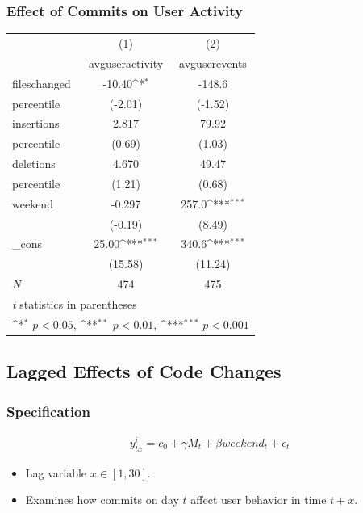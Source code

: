 \documentclass[xcolor=pdftex,dvipsnames,table]{beamer}
\begin{document}
\frame
{
    \frametitle{Effect of Commits on User Activity}
    \begin{table}[h!]
    \footnotesize
    \centering
    {
        \def\sym#1{\ifmmode^{#1}\else\(^{#1}\)\fi}
        \begin{tabular}{l*{2}{c}}
        \hline\hline
            &\multicolumn{1}{c}{(1)}&\multicolumn{1}{c}{(2)}\\
            &\multicolumn{1}{c}{avguseractivity}&\multicolumn{1}{c}{avguserevents}\\
            \hline
            fileschanged&     -10.40\sym{*}         &    -148.6  \\
 percentile           &     (-2.01)         &     (-1.52)   \\
            [1em]
            insertions&      2.817  &     79.92 \\
percentile
    &      (0.69)         &      (1.03)         \\
        [1em]
        deletions&      4.670        &    49.47    \\
        percentile&      (1.21)         &      (0.68)   \\
        [1em]
        weekend     &    -0.297&    257.0\sym{***}\\
        &    (-0.19)         &     (8.49)      \\
        [1em]
        \_cons      &     25.00\sym{***}&    340.6\sym{***}\\
        &     (15.58)         &     (11.24)      \\
        \hline
        \(N\)       &         474         &         475     \\
        \hline\hline
        \multicolumn{3}{l}{\footnotesize \textit{t} statistics in parentheses}\\
        \multicolumn{3}{l}{\footnotesize \sym{*} \(p<0.05\), \sym{**} \(p<0.01\), \sym{***} \(p<0.001\)}\\
        \end{tabular}
    }
    \end{table}
}

\subsection{Lagged Effects of Code Changes}

\frame
{
    \frametitle{Specification}
    \begin{eqnarray}
    y^i_{tx} = c_0 + \gamma M_{t} + \beta weekend_{t} + \epsilon_t
    \end{eqnarray}

    \begin{itemize}
        \item Lag variable $x \in [1,30]$. 
        \item Examines how commits on day $t$ affect user behavior in time $t + x$. 
    \end{itemize}

}
\end{document}
